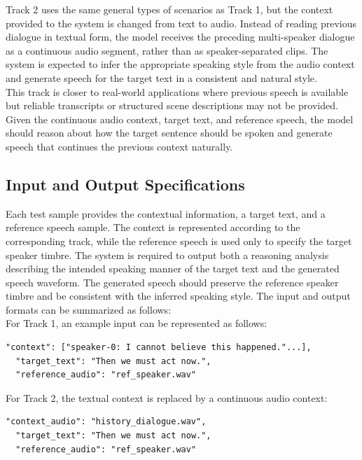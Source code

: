 \documentclass[a4paper]{article}
\begin{document}
Track 2 uses the same general types of scenarios as Track 1, but the context provided to the system is changed from text to audio. Instead of reading previous dialogue in textual form, the model receives the preceding multi-speaker dialogue as a continuous audio segment, rather than as speaker-separated clips. The system is expected to infer the appropriate speaking style from the audio context and generate speech for the target text in a consistent and natural style.\\

\noindent This track is closer to real-world applications where previous speech is available but reliable transcripts or structured scene descriptions may not be provided. Given the continuous audio context, target text, and reference speech, the model should reason about how the target sentence should be spoken and generate speech that continues the previous context naturally.

\subsection{Input and Output Specifications}

Each test sample provides the contextual information, a target text, and a reference speech sample. The context is represented according to the corresponding track, while the reference speech is used only to specify the target speaker timbre. The system is required to output both a reasoning analysis describing the intended speaking manner of the target text and the generated speech waveform. The generated speech should preserve the reference speaker timbre and be consistent with the inferred speaking style. The input and output formats can be summarized as follows:\\

\noindent For Track 1, an example input can be represented as follows:
\begin{lstlisting}[style=jsonstyle]
  "context": ["speaker-0: I cannot believe this happened."...],
  "target_text": "Then we must act now.",
  "reference_audio": "ref_speaker.wav"
\end{lstlisting}

\noindent For Track 2, the textual context is replaced by a continuous audio context:
\begin{lstlisting}[style=jsonstyle]
  "context_audio": "history_dialogue.wav",
  "target_text": "Then we must act now.",
  "reference_audio": "ref_speaker.wav"
\end{lstlisting}
\end{document}
